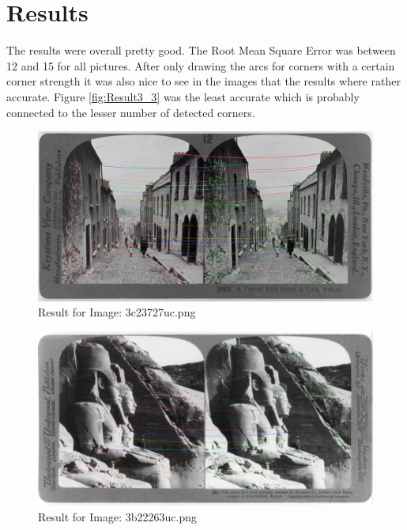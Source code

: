 \section{Results}
The results were overall pretty good. The Root Mean Square Error was between 12 and 15 for all pictures. After only drawing the arcs for corners with a certain corner strength it was also nice to see in the images that the results where rather accurate. Figure \ref{fig:Result3_3} was the least accurate which is probably connected to the lesser number of detected corners.

\begin{figure}
	\centering
	\includegraphics[width=1\linewidth]{images/ass03result1}
	\caption{Result for Image: 3c23727uc.png}
	\label{fig:Result3_1}
\end{figure}

\begin{figure}
	\centering
	\includegraphics[width=1\linewidth]{images/ass03result2}
	\caption{Result for Image: 3b22263uc.png}
	\label{fig:Result3_2}
\end{figure}

